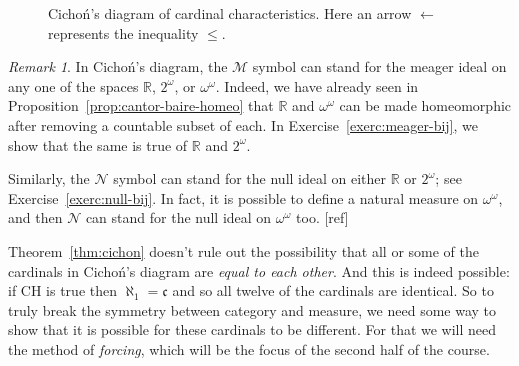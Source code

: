 \documentclass[11pt,oneside,a4paper]{amsbook}
\newcommand{\R}{\mathbb R}
\newcommand{\Null}{\mathcal N}
\newcommand{\Meager}{\mathcal M}
\DeclareMathOperator{\add}{\mathsf{add}}
\DeclareMathOperator{\non}{\mathsf{non}}
\DeclareMathOperator{\cov}{\mathsf{cov}}
\DeclareMathOperator{\cof}{\mathsf{cof}}
\theoremstyle{definition}
\theoremstyle{plain}
\theoremstyle{definition}
\theoremstyle{remark}
\newtheorem{remark}[theorem]{Remark}
\numberwithin{equation}{section}
\numberwithin{figure}{section}
\begin{document}
\begin{figure}[h]
  \caption{Cicho\'n's diagram of cardinal characteristics. Here an arrow $\leftarrow$ represents the inequality $\leq$.\label{fig:cichon}}
\end{figure}

\begin{remark}
  In Cicho\'n's diagram, the $\Meager$ symbol can stand for the meager ideal on any one of the spaces $\R$, $2^\omega$, or $\omega^\omega$. Indeed, we have already seen in Proposition~\ref{prop:cantor-baire-homeo} that $\R$ and $\omega^\omega$ can be made homeomorphic after removing a countable subset of each. In Exercise~\ref{exerc:meager-bij}, we show that the same is true of $\R$ and $2^\omega$.

  Similarly, the $\Null$ symbol can stand for the null ideal on either $\R$ or $2^\omega$; see Exercise~\ref{exerc:null-bij}. In fact, it is possible to define a natural measure on $\omega^\omega$, and then $\Null$ can stand for the null ideal on $\omega^\omega$ too.
  [ref] %
\end{remark}

Theorem~\ref{thm:cichon} doesn't rule out the possibility that all or some of the cardinals in Cicho\'n's diagram are \emph{equal to each other}. And this is indeed possible: if CH is true then $\aleph_1=\mathfrak c$ and so all twelve of the cardinals are identical. So to truly break the symmetry between category and measure, we need some way to show that it is possible for these cardinals to be different. For that we will need the method of \emph{forcing}, which will be the focus of the second half of the course.
\end{document}
